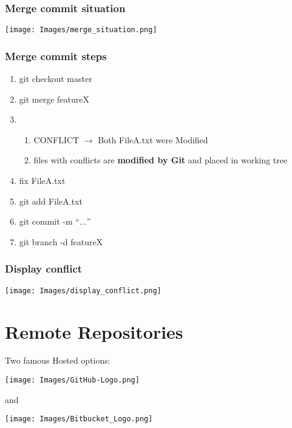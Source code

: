 \documentclass{beamer}
\begin{document}
	\begin{frame}[plain]
		\frametitle{Merge commit situation}
	
		\begin{center}
			\texttt{[image: Images/merge\_situation.png]}
		\end{center}
	
	\end{frame}

	\begin{frame}[plain]
		\frametitle{Merge commit steps}

		\begin{enumerate}
			\item git checkout master 
			\item git merge featureX
			\item \begin{enumerate}
				\item CONFLICT $\rightarrow$ Both FileA.txt were Modified
				\item files with conflicts are \textbf{modified by Git} and placed in working tree
			\end{enumerate}
			\item fix FileA.txt
			\item git add FileA.txt
			\item git commit -m ``$\ldots$''
			\item git branch -d featureX
		\end{enumerate}
	\end{frame}

	\begin{frame}[plain]
		\frametitle{Display conflict}
		
		\begin{center}
			\texttt{[image: Images/display\_conflict.png]}
		\end{center}
		
	\end{frame}

	\section{Remote Repositories}
	\begin{frame}[plain]
		Two famous Hosted options:
		\begin{center}
			\texttt{[image: Images/GitHub-Logo.png]}
		\end{center}
		and
		\begin{center}
			\texttt{[image: Images/Bitbucket\_Logo.png]}
		\end{center}
		
	\end{frame}
\end{document}
